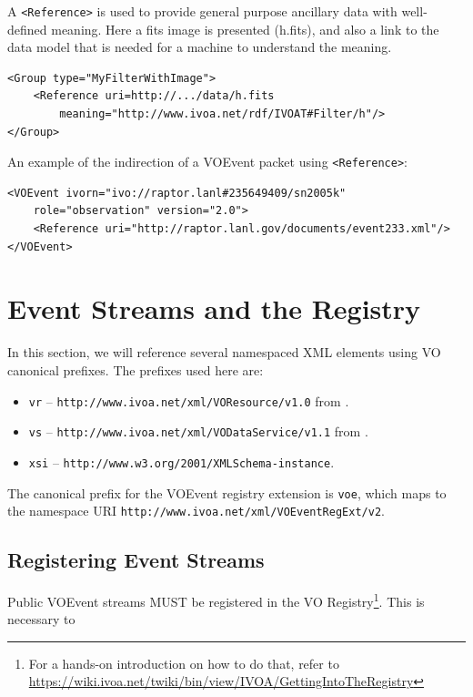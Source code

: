 \documentclass[11pt,a4paper]{ivoa}
\begin{document}
A {\tt <Reference>} is used to provide general purpose ancillary data with well-defined meaning. Here a fits image is presented (h.fits), and also a link to the data model that is needed for a machine to understand the meaning. 
{\footnotesize
\begin{verbatim}
<Group type="MyFilterWithImage">
    <Reference uri=http://.../data/h.fits 
        meaning="http://www.ivoa.net/rdf/IVOAT#Filter/h"/>
</Group> 
\end{verbatim}}
An example of the indirection of a VOEvent packet using {\tt <Reference>}:  
{\footnotesize
\begin{verbatim}
<VOEvent ivorn="ivo://raptor.lanl#235649409/sn2005k" 
    role="observation" version="2.0">   
    <Reference uri="http://raptor.lanl.gov/documents/event233.xml"/>
</VOEvent> 
\end{verbatim}}

\section{Event Streams and the Registry}
\label{sec:registry-matters}

In this section, we will reference several namespaced XML elements using
VO canonical prefixes.  The prefixes used here are:

\begin{itemize}
\item \verb|vr| -- \nolinkurl{http://www.ivoa.net/xml/VOResource/v1.0}
from \citet{2018ivoa.spec.0625P}.
\item \verb|vs| --
\nolinkurl{http://www.ivoa.net/xml/VODataService/v1.1}
from \citet{todo:VODataService-1.2}.
\item \verb|xsi| --
\nolinkurl{http://www.w3.org/2001/XMLSchema-instance}.
\end{itemize}

The canonical prefix for the VOEvent registry extension is \verb|voe|,
which maps to the namespace URI
\nolinkurl{http://www.ivoa.net/xml/VOEventRegExt/v2}.

\subsection{Registering Event Streams}
\label{sec:registering}

Public VOEvent streams MUST be registered in the VO
Registry\footnote{For a hands-on introduction on how to do that, refer
to
\url{https://wiki.ivoa.net/twiki/bin/view/IVOA/GettingIntoTheRegistry}}.
This is necessary to
\end{document}
